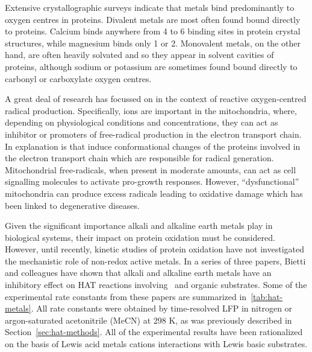 Extensive crystallographic surveys indicate that metals bind predominantly to oxygen centres in proteins.\cite{Harding1999, Harding2004, Hsin2008} Divalent metals are most often found bound directly to proteins. Calcium binds anywhere from 4 to 6 binding sites in protein crystal structures, while magnesium binds only 1 or 2. Monovalent metals, on the other hand, are often heavily solvated and so they appear in solvent cavities of proteins, although sodium or potassium are sometimes found bound directly to carbonyl or carboxylate oxygen centres.\cite{Harding2010}

A great deal of research has focussed on  in the context of reactive oxygen-centred radical production.\cite{Goerlach2015} Specifically,  ions are important in the mitochondria, where, depending on physiological conditions and concentrations, they can act as inhibitor or promoters of free-radical production in the electron transport chain.\cite{AdamVizi2010} In explanation is that  induce conformational changes of the proteins involved in the electron transport chain which are responsible for radical generation.\cite{Brookes2004} Mitochondrial free-radicals, when present in moderate amounts, can act as cell signalling molecules to activate pro-growth responses.\cite{Sullivan2014} However, ``dysfunctional'' mitochondria can produce excess radicals leading to oxidative damage which has been linked to degenerative diseases.

Given the significant importance alkali and alkaline earth metals play in biological systems, their impact on protein oxidation must be considered. However, until recently, kinetic studies of protein oxidation have not investigated the mechanistic role of non-redox active metals. In a series of three papers,\cite{Salamone2013a, Salamone2015metals, Salamone2016} Bietti and colleagues have shown that alkali and alkaline earth metals have an inhibitory effect on HAT reactions involving \cumo\ and organic substrates. Some of the experimental rate constants from these papers are summarized in~\ref{tab:hat-metals}. All rate constants were obtained by time-resolved LFP in nitrogen or argon-saturated acetonitrile (MeCN) at 298 K, as was previously described in Section~\ref{sec:hat-methods}. All of the experimental results have been rationalized on the basis of Lewis acid metals cations interactions with Lewis basic substrates.


